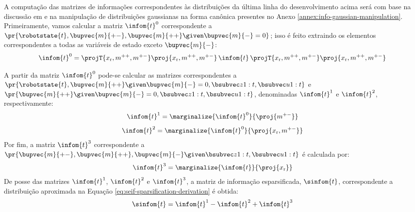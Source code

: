 A computação das matrizes de informações correspondentes às distribuições da última linha do desenvolvimento acima será com base na discussão em \cite[p.~401]{thrun2005probabilistic} e na manipulação de distribuições gaussianas na forma canônica presentes no Anexo \ref{annex:info-gaussian-manipulation}. 
Primeiramente, vamos calcular a matriz $\infom{t}^{0}$ correspondente 
a $\pr{\robotstate{t}, \bupvec{m}{+-}, \bupvec{m}{++} \given \bupvec{m}{-} = 0}$; isso é feito extraindo os elementos correspondentes a 
todas as variáveis de estado exceto $\bupvec{m}{-}$:
\newcommand{\OmegaZeroValue}{\projT{x_\mathrm{r}, m^{++}, m^{+-}} \proj{x_\mathrm{r}, m^{++}, m^{+-}} \, \infom{t} \, \projT{x_\mathrm{r}, m^{++}, m^{+-}} \proj{x_\mathrm{r}, m^{++}, m^{+-}}}
\begin{equation}
  \infom{t}^0 = \OmegaZeroValue
  \label{eq:seif-omega-zero}
\end{equation}

A partir da matriz $\infom{t}^0$ pode-se calcular as matrizes 
correspondentes a\\
$\pr{\robotstate{t},\bupvec{m}{++}  \given \bupvec{m}{-}=0, \slamvars}$ e $\pr{\bupvec{m}{++}  \given \bupvec{m}{-}=0, \slamvars}$, denominadas $\infom{t}^1$ e $\infom{t}^2$, 
respectivamente:
\newcommand{\OmegaOneValue}{\marginalize{\infom{t}^0}{\proj{m^{+-}}}}
\begin{equation}
  \infom{t}^1 = \OmegaOneValue
\end{equation}
\newcommand{\OmegaTwoValue}{\marginalize{\infom{t}^0}{\proj{x_\mathrm{r}, m^{+-}}}}
\begin{equation}
  \infom{t}^2 = \OmegaTwoValue
\end{equation}
Por fim, a matriz $\infom{t}^3$ correspondente a $\pr{\bupvec{m}{+-}, \bupvec{m}{++}, \bupvec{m}{-} \given \slamvars}$ é calculada por:
\newcommand{\OmegaThreeValue}{\marginalize{\infom{t}}{\proj{x_\mathrm{r}}}}
\begin{equation}
  \infom{t}^3 = \OmegaThreeValue
\end{equation}
De posse das matrizes $\infom{t}^1$, $\infom{t}^2$ e $\infom{t}^3$, a 
matriz de informação esparsificada, $\sinfom{t}$, correspondente a distribuição 
aproximada na Equação \ref{eq:seif-sparsification-derivation} é obtida:
\begin{equation}
  \sinfom{t} = \infom{t}^1 - \infom{t}^2 + \infom{t}^3
  \label{eq:seif-sparse-infom}
\end{equation}

